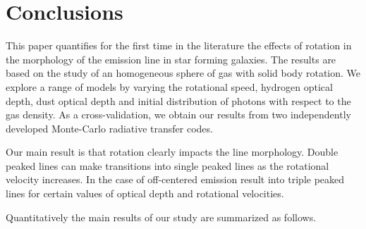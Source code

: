 \documentclass{emulateapj}
\newcommand{\ly}{{\ifmmode{{\rm Ly}\alpha~}\else{Ly$\alpha$~}\fi}}
\begin{document}
\section{Conclusions}
\label{sec:conclusions}

This paper quantifies for the first time in the literature the effects
of rotation in the morphology of the \ly emission line in star forming
galaxies.  The results are based on the study of an homogeneous sphere
of gas with solid body rotation. We explore a range of models by varying
the rotational speed, hydrogen optical depth, dust optical depth and
initial distribution of \ly photons with respect to the gas
density. As a cross-validation, we obtain our results from two
independently developed Monte-Carlo radiative transfer codes. 

Our main result is that rotation clearly impacts the \ly line
morphology. Double peaked lines can make transitions into single
peaked lines as the rotational velocity increases. In the case of
off-centered emission result into triple peaked lines for certain
values of optical depth and rotational velocities. 

Quantitatively the main results of our study are summarized as follows.
\end{document}
